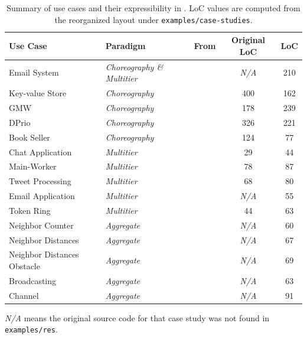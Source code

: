 \begin{table}[h]
  \footnotesize
  \begin{tabular}{llc|c|c}
    \toprule
    \textbf{Use Case} & \textbf{Paradigm} & \textbf{From} & \textbf{Original LoC} & \textbf{\sysname{} LoC} \\
    \midrule
      Email System &
        \emph{Choreography \& Multitier} &
        \cite{DBLP:conf/ecoop/GiallorenzoMPRS21} &
        \textit{N/A} &
        210 \\
      Key-value Store &
        \emph{Choreography} &
        \cite{DBLP:journals/pacmpl/BatesKJSKN25,10.1145/3607849} &
        400 &
        162 \\
      GMW &
        \emph{Choreography} &
        \cite{DBLP:journals/pacmpl/BatesKJSKN25} &
        178 &
        239 \\
      DPrio &
        \emph{Choreography} &
        \cite{DBLP:journals/pacmpl/BatesKJSKN25} &
        326 &
        221 \\
      Book Seller &
        \emph{Choreography} &
        \cite{10.1145/3607849} &
        124 &
        77 \\
      Chat Application &
        \emph{Multitier} &
        \cite{DBLP:journals/pacmpl/WeisenburgerKS18} &
        29 &
        44 \\
      Main-Worker &
        \emph{Multitier} &
        \cite{DBLP:journals/pacmpl/WeisenburgerKS18} &
        78 &
        87 \\
      Tweet Processing &
        \emph{Multitier} &
        \cite{DBLP:journals/pacmpl/WeisenburgerKS18} &
        68 &
        80 \\
      Email Application &
        \emph{Multitier} &
        \cite{DBLP:journals/pacmpl/WeisenburgerKS18} &
        \textit{N/A} &
        55 \\
      Token Ring &
        \emph{Multitier} &
        \cite{DBLP:journals/pacmpl/WeisenburgerKS18} &
        44 &
        63 \\
      Neighbor Counter &
        \emph{Aggregate} &
        \cite{} &
        \textit{N/A} &
        60 \\
      Neighbor Distances &
        \emph{Aggregate} &
        \cite{} &
        \textit{N/A} &
        67 \\
      Neighbor Distances Obstacle &
        \emph{Aggregate} &
        \cite{} &
        \textit{N/A} &
        69 \\
      Broadcasting &
        \emph{Aggregate} &
        \cite{} &
        \textit{N/A} &
        63 \\
      Channel &
        \emph{Aggregate} &
        \cite{} &
        \textit{N/A} &
        91 \\
    \bottomrule
  \end{tabular}
  \caption{Summary of use cases and their expressibility in \sysname{}.
  LoC values are computed from the reorganized layout under \texttt{examples/case-studies}.}
  \label{tab:use-cases}
  \begin{tablenotes}
    \small
    \item \textit{N/A} means the original source code for that case study was not found in \texttt{examples/res}.
  \end{tablenotes}
\end{table}
